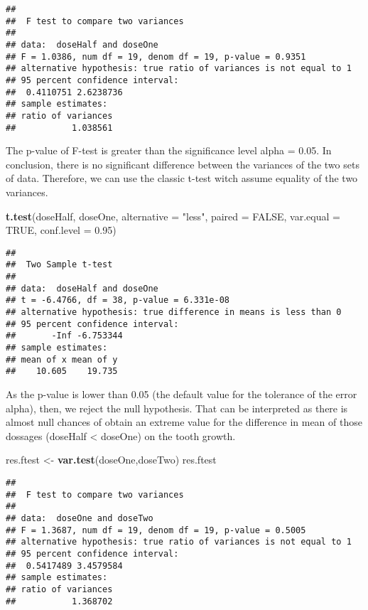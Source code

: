\documentclass[]{article}
\newenvironment{Shaded}{\begin{snugshade}}{\end{snugshade}}
\newcommand{\KeywordTok}[1]{\textcolor[rgb]{0.13,0.29,0.53}{\textbf{#1}}}
\newcommand{\DataTypeTok}[1]{\textcolor[rgb]{0.13,0.29,0.53}{#1}}
\newcommand{\FloatTok}[1]{\textcolor[rgb]{0.00,0.00,0.81}{#1}}
\newcommand{\StringTok}[1]{\textcolor[rgb]{0.31,0.60,0.02}{#1}}
\newcommand{\OtherTok}[1]{\textcolor[rgb]{0.56,0.35,0.01}{#1}}
\newcommand{\NormalTok}[1]{#1}
\begin{document}
\begin{verbatim}
## 
##  F test to compare two variances
## 
## data:  doseHalf and doseOne
## F = 1.0386, num df = 19, denom df = 19, p-value = 0.9351
## alternative hypothesis: true ratio of variances is not equal to 1
## 95 percent confidence interval:
##  0.4110751 2.6238736
## sample estimates:
## ratio of variances 
##           1.038561
\end{verbatim}

The p-value of F-test is greater than the significance level alpha =
0.05. In conclusion, there is no significant difference between the
variances of the two sets of data. Therefore, we can use the classic
t-test witch assume equality of the two variances.

\begin{Shaded}
\begin{Highlighting}[]
\KeywordTok{t.test}\NormalTok{(doseHalf, doseOne, }\DataTypeTok{alternative =} \StringTok{"less"}\NormalTok{, }\DataTypeTok{paired =} \OtherTok{FALSE}\NormalTok{, }\DataTypeTok{var.equal =} \OtherTok{TRUE}\NormalTok{, }\DataTypeTok{conf.level =} \FloatTok{0.95}\NormalTok{)}
\end{Highlighting}
\end{Shaded}

\begin{verbatim}
## 
##  Two Sample t-test
## 
## data:  doseHalf and doseOne
## t = -6.4766, df = 38, p-value = 6.331e-08
## alternative hypothesis: true difference in means is less than 0
## 95 percent confidence interval:
##       -Inf -6.753344
## sample estimates:
## mean of x mean of y 
##    10.605    19.735
\end{verbatim}

As the p-value is lower than 0.05 (the default value for the tolerance
of the error alpha), then, we reject the null hypothesis. That can be
interpreted as there is almost null chances of obtain an extreme value
for the difference in mean of those dossages (doseHalf \textless{}
doseOne) on the tooth growth.

\begin{Shaded}
\begin{Highlighting}[]
\NormalTok{res.ftest <-}\StringTok{ }\KeywordTok{var.test}\NormalTok{(doseOne,doseTwo)}
\NormalTok{res.ftest}
\end{Highlighting}
\end{Shaded}

\begin{verbatim}
## 
##  F test to compare two variances
## 
## data:  doseOne and doseTwo
## F = 1.3687, num df = 19, denom df = 19, p-value = 0.5005
## alternative hypothesis: true ratio of variances is not equal to 1
## 95 percent confidence interval:
##  0.5417489 3.4579584
## sample estimates:
## ratio of variances 
##           1.368702
\end{verbatim}
\end{document}
